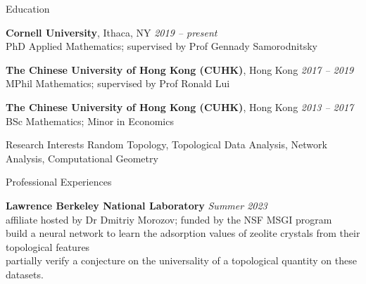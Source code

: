 \documentclass{resume} %
\begin{document}

\begin{rSection}{Education}

{\bf Cornell University}, Ithaca, NY \hfill
{\em 2019 -- present} \\
PhD Applied Mathematics; supervised by Prof Gennady Samorodnitsky

{\bf The Chinese University of Hong Kong (CUHK)}, Hong Kong \hfill
{\em 2017 -- 2019} \\
MPhil Mathematics; supervised by Prof Ronald Lui %

{\bf The Chinese University of Hong Kong (CUHK)}, Hong Kong \hfill
{\em 2013 -- 2017} \\
BSc Mathematics; Minor in Economics %




\end{rSection}

\begin{rSection}{Research Interests}
 Random Topology, Topological Data Analysis, Network Analysis, Computational Geometry
\end{rSection}


\begin{rSection}{Professional Experiences}

{\bf Lawrence Berkeley National Laboratory} \hfill
{\em Summer 2023} \\
affiliate hosted by Dr Dmitriy Morozov; funded by the NSF MSGI program\\
build a neural network to learn the adsorption values of zeolite crystals from their topological features\\
partially verify a conjecture on the universality of a topological quantity on these datasets.

\end{rSection}
\end{document}
